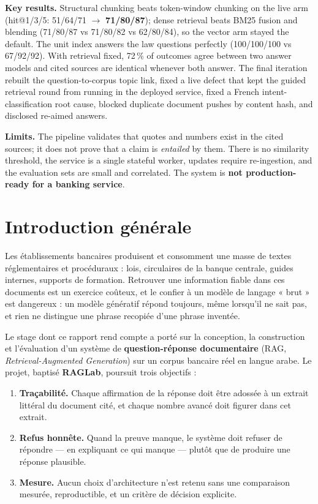 \documentclass[a4paper,12pt]{report}
\begin{document}
\textbf{Key results.} Structural chunking beats token-window chunking on the live arm
(hit@1/3/5: 51/64/71 $\rightarrow$ \textbf{71/80/87}); dense retrieval beats BM25 fusion and
blending (71/80/87 vs 71/80/82 vs 62/80/84), so the vector arm stayed the default. The unit index
answers the law questions perfectly (100/100/100 vs 67/92/92). With retrieval fixed, 72\,\% of
outcomes agree between two answer models and cited sources are identical whenever both answer.
The final iteration rebuilt the question-to-corpus topic link, fixed a live defect that kept the
guided retrieval round from running in the deployed service, fixed a French intent-classification
root cause, blocked duplicate document pushes by content hash, and disclosed re-aimed answers.

\textbf{Limits.} The pipeline validates that quotes and numbers exist in the cited sources; it
does not prove that a claim is \emph{entailed} by them. There is no similarity threshold, the
service is a single stateful worker, updates require re-ingestion, and the evaluation sets are
small and correlated. The system is \textbf{not production-ready for a banking service}.

\tableofcontents

\chapter{Introduction générale}

Les établissements bancaires produisent et consomment une masse de textes réglementaires et
procéduraux : lois, circulaires de la banque centrale, guides internes, supports de formation.
Retrouver une information fiable dans ces documents est un exercice coûteux, et le confier à un
modèle de langage « brut » est dangereux : un modèle génératif répond toujours, même lorsqu'il ne
sait pas, et rien ne distingue une phrase recopiée d'une phrase inventée.

Le stage dont ce rapport rend compte a porté sur la conception, la construction et l'évaluation
d'un système de \textbf{question-réponse documentaire} (RAG, \emph{Retrieval-Augmented
Generation}) sur un corpus bancaire réel en langue arabe. Le projet, baptisé \textbf{RAGLab},
poursuit trois objectifs :

\begin{enumerate}
  \item \textbf{Traçabilité.} Chaque affirmation de la réponse doit être adossée à un extrait
        littéral du document cité, et chaque nombre avancé doit figurer dans cet extrait.
  \item \textbf{Refus honnête.} Quand la preuve manque, le système doit refuser de répondre — en
        expliquant ce qui manque — plutôt que de produire une réponse plausible.
  \item \textbf{Mesure.} Aucun choix d'architecture n'est retenu sans une comparaison mesurée,
        reproductible, et un critère de décision explicite.
\end{enumerate}
\end{document}
